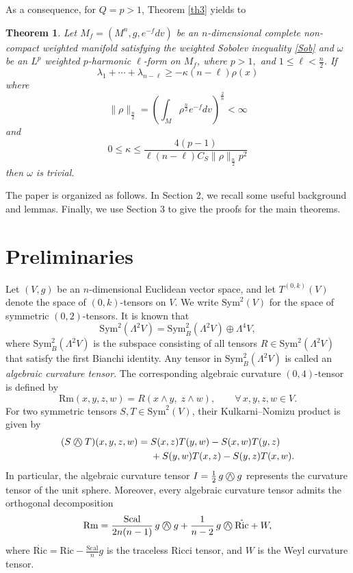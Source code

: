 \documentclass[10pt,a4paper]{amsart}
\newtheorem{theorem}{\indent\sc Theorem}[section]
\newtheorem{remark}[theorem]{\indent\sc Remark}
\numberwithin{equation}{section}
\newcommand{\KN}{\mathbin{\bigcirc\mspace{-15mu}\wedge\mspace{3mu}}}
\begin{document}
As a consequence, for $Q=p>1$, Theorem \ref{th3} yields to
\begin{theorem}
	Let $M_f=(M^n,g,e^{-f}dv)$ be an $n$-dimensional complete non-compact weighted manifold satisfying the weighted Sobolev inequality \eqref{Sob} and $\omega$ be an $L^p$ weighted $p$-harmonic $\ell$-form on $M_f$, where $p>1,$ and $1\le \ell < \frac{n}{2}$. 
	If	$$\lambda_1+\cdots+\lambda_{n-\ell}\ge -\kappa(n-\ell)\rho(x)	$$
	where $$\|\rho\|_{\frac{n}{2}}=\left(\int_M \rho^{\frac{n}{2}}e^{-f}dv \right)^{\frac{2}{n}}<\infty$$
	 and $$0\le \kappa\le \frac{4(p-1)}{\ell (n-\ell)C_S \|\rho\|_{\frac{n}{2}}p^2}$$
	then $\omega$ is trivial.
\end{theorem}

The paper is organized as follows. In Section 2, we recall some useful background and lemmas. Finally, we use Section 3 to give the proofs for the main theorems.

\section{Preliminaries}\label{sec2}
Let $(V,g)$ be an $n$-dimensional Euclidean vector space, and let
$T^{(0,k)}(V)$ denote the space of $(0,k)$-tensors on $V$. We write
$\mathrm{Sym}^2(V)$ for the space of symmetric $(0,2)$-tensors. It is known that
\[
\mathrm{Sym}^2(\Lambda^2V)
=
\mathrm{Sym}_B^2(\Lambda^2V)
\oplus
\Lambda^4V,
\]
where $\mathrm{Sym}_B^2(\Lambda^2V)$ is the subspace consisting of all tensors
$R\in\mathrm{Sym}^2(\Lambda^2V)$ that satisfy the first Bianchi identity.
Any tensor in $\mathrm{Sym}_B^2(\Lambda^2V)$ is called an
\emph{algebraic curvature tensor}.
The corresponding algebraic curvature $(0,4)$-tensor is defined by
\[
\mathrm{Rm}(x,y,z,w)
=
R(x\wedge y,\; z\wedge w),
\qquad
\forall\, x,y,z,w\in V.
\]
For two symmetric tensors $S,T\in\mathrm{Sym}^2(V)$, their
Kulkarni--Nomizu product is given by
\[
\begin{aligned}
(S\KN T)(x,y,z,w)
={}&
S(x,z)T(y,w)-S(x,w)T(y,z) \\
&
+S(y,w)T(x,z)-S(y,z)T(x,w).
\end{aligned}
\]
In particular, the algebraic curvature tensor $I=\frac12\,g\KN g$
represents the curvature tensor of the unit sphere.
Moreover, every algebraic curvature tensor admits the orthogonal decomposition
\[
\mathrm{Rm} = \frac{\mathrm{Scal}}{2n(n-1)}\,g\KN g +
\frac{1}{n-2}\,g\KN\mathring{\mathrm{Ric}} + W,
\]
where
$\mathring{\mathrm{Ric}} =\mathrm{Ric} - \frac{\mathrm{Scal}}{n}g$
is the traceless Ricci tensor, and $W$ is the Weyl curvature tensor.
\end{document}
